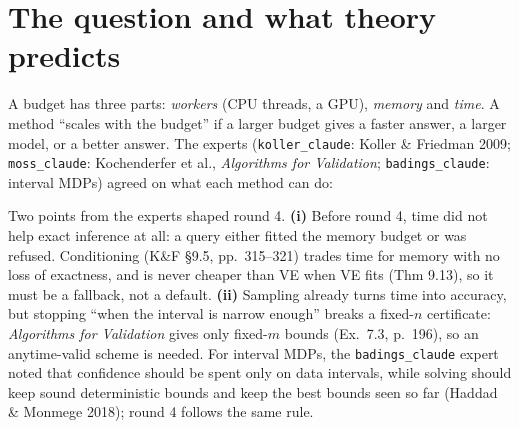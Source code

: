 \documentclass[10pt,a4paper]{article}
\newcommand{\code}[1]{\texttt{#1}}
\begin{document}
\section{The question and what theory predicts}
A budget has three parts: \emph{workers} (CPU threads, a GPU), \emph{memory} and \emph{time}.
A method ``scales with the budget'' if a larger budget gives a faster answer, a larger model, or a
better answer. The experts (\code{koller\_claude}: Koller \& Friedman 2009; \code{moss\_claude}:
Kochenderfer et al., \emph{Algorithms for Validation}; \code{badings\_claude}: interval MDPs)
agreed on what each method can do:
\begin{table}[H]\centering\small
\caption{What each budget part can buy, by method (theory; $n$ variables, $K$ values, width $w$).}
\end{table}
Two points from the experts shaped round 4. \textbf{(i)} Before round 4, time did not help exact
inference at all: a query either fitted the memory budget or was refused. Conditioning (K\&F §9.5,
pp.\ 315--321) trades time for memory with no loss of exactness, and is never cheaper than VE when
VE fits (Thm 9.13), so it must be a fallback, not a default. \textbf{(ii)} Sampling already turns
time into accuracy, but stopping ``when the interval is narrow enough'' breaks a fixed-$n$
certificate: \emph{Algorithms for Validation} gives only fixed-$m$ bounds (Ex.\ 7.3, p.\ 196), so
an anytime-valid scheme is needed. For interval MDPs, the \code{badings\_claude} expert noted that
confidence should be spent only on data intervals, while solving should keep sound deterministic
bounds and keep the best bounds seen so far (Haddad \& Monmege 2018); round 4 follows the same rule.
\end{document}
